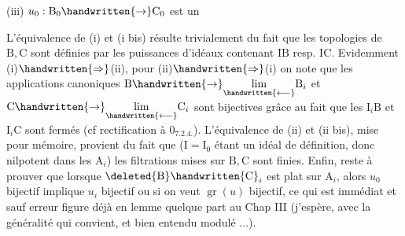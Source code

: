 (iii) $u_0:\mathrm B_0\handwritten{\to}\mathrm C_0$ est un  \handwritten{$\uparrow$}

L’équivalence de (i) et (i bis) résulte trivialement du fait que les topologies de $\mathrm B,\mathrm C$ sont  définies par les puissances d’idéaux contenant $\mathrm{IB}$ resp. $\mathrm{IC}$.  Evidemment (i)$\handwritten{\Rightarrow}$(ii), pour (ii)$\handwritten{\Rightarrow}$(i) on note que les applications canoniques $\mathrm B\handwritten{\to}\underset{\handwritten{\longleftarrow}}{\lim}\mathrm B_i$ et $\mathrm C\handwritten{\to}\underset{\handwritten{\longleftarrow}}{\lim}\mathrm C_i$ sont bijectives grâce au fait que les $\mathrm I_i\mathrm B$ et $\mathrm I_i\mathrm C$ sont fermés (cf rectification à $0_{7.2.4.}$). L’équivalence de (ii) et (ii bis),  mise pour mémoire, provient du fait que ($\mathrm I=\mathrm I_0$ étant un idéal de définition, donc nilpotent dans les $\mathrm A_i$) les filtrations mises sur $\mathrm B,\mathrm C$ sont finies. Enfin, reste à prouver que lorsque  $\deleted{\mathrm B}\handwritten{\mathrm C}_i$ est plat sur $\mathrm A_i$, alors $u_0$ bijectif implique $u_i$ bijectif ou si on veut $\operatorname{gr}(u)$ bijectif, ce qui est immédiat et sauf erreur figure déjà en lemme quelque part au Chap III (j’espère, avec la généralité qui convient, et bien entendu modulé ...). 

